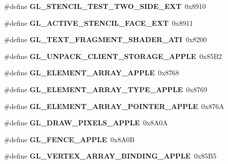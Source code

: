\begin{DoxyCompactItemize}
\item 
\#define {\bfseries G\+L\+\_\+\+S\+T\+E\+N\+C\+I\+L\+\_\+\+T\+E\+S\+T\+\_\+\+T\+W\+O\+\_\+\+S\+I\+D\+E\+\_\+\+E\+X\+T}~0x8910\label{_s_d_l__opengl_8h_a823a39df4e965f6665ad70743c725947}

\item 
\#define {\bfseries G\+L\+\_\+\+A\+C\+T\+I\+V\+E\+\_\+\+S\+T\+E\+N\+C\+I\+L\+\_\+\+F\+A\+C\+E\+\_\+\+E\+X\+T}~0x8911\label{_s_d_l__opengl_8h_ad95865cf31ada5dececbc1fe5951a108}

\item 
\#define {\bfseries G\+L\+\_\+\+T\+E\+X\+T\+\_\+\+F\+R\+A\+G\+M\+E\+N\+T\+\_\+\+S\+H\+A\+D\+E\+R\+\_\+\+A\+T\+I}~0x8200\label{_s_d_l__opengl_8h_a7e6f36618146339c89a54740631d2bcf}

\item 
\#define {\bfseries G\+L\+\_\+\+U\+N\+P\+A\+C\+K\+\_\+\+C\+L\+I\+E\+N\+T\+\_\+\+S\+T\+O\+R\+A\+G\+E\+\_\+\+A\+P\+P\+L\+E}~0x85\+B2\label{_s_d_l__opengl_8h_ac1729649cf983ca18459756c75e257f0}

\item 
\#define {\bfseries G\+L\+\_\+\+E\+L\+E\+M\+E\+N\+T\+\_\+\+A\+R\+R\+A\+Y\+\_\+\+A\+P\+P\+L\+E}~0x8768\label{_s_d_l__opengl_8h_a7fc353ac3c76d53cb162072300670bea}

\item 
\#define {\bfseries G\+L\+\_\+\+E\+L\+E\+M\+E\+N\+T\+\_\+\+A\+R\+R\+A\+Y\+\_\+\+T\+Y\+P\+E\+\_\+\+A\+P\+P\+L\+E}~0x8769\label{_s_d_l__opengl_8h_a3ce2959fd646905d25c97abd6fb95ed3}

\item 
\#define {\bfseries G\+L\+\_\+\+E\+L\+E\+M\+E\+N\+T\+\_\+\+A\+R\+R\+A\+Y\+\_\+\+P\+O\+I\+N\+T\+E\+R\+\_\+\+A\+P\+P\+L\+E}~0x876\+A\label{_s_d_l__opengl_8h_a77c3712148562c3843a1e1c1f48bce1f}

\item 
\#define {\bfseries G\+L\+\_\+\+D\+R\+A\+W\+\_\+\+P\+I\+X\+E\+L\+S\+\_\+\+A\+P\+P\+L\+E}~0x8\+A0\+A\label{_s_d_l__opengl_8h_aceb9698f0d16cb824b27ccae1fd89708}

\item 
\#define {\bfseries G\+L\+\_\+\+F\+E\+N\+C\+E\+\_\+\+A\+P\+P\+L\+E}~0x8\+A0\+B\label{_s_d_l__opengl_8h_a43f6c8e4fc3dadc613cb9a59cd56954d}

\item 
\#define {\bfseries G\+L\+\_\+\+V\+E\+R\+T\+E\+X\+\_\+\+A\+R\+R\+A\+Y\+\_\+\+B\+I\+N\+D\+I\+N\+G\+\_\+\+A\+P\+P\+L\+E}~0x85\+B5\label{_s_d_l__opengl_8h_a9325608c1db5fdde01919a4a280fb389}


\end{DoxyCompactItemize}
